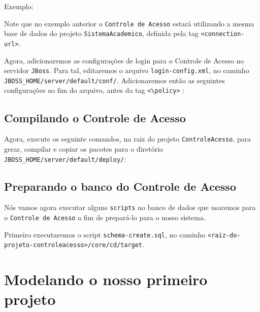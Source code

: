 Exemplo:

\begin{framed}
	
\end{framed}

Note que no exemplo anterior o \texttt{Controle de Acesso} estará utilizando a
mesma base de dados do projeto \texttt{SistemaAcademico}, definida pela tag
\texttt{<connection-url>}.

Agora, adicionaremos as configurações de login para o Controle de Acesso no
servidor \texttt{JBoss}. Para tal, editaremos o arquivo
\texttt{login-config.xml}, no caminho \texttt{JBOSS\_HOME/server/default/conf/}.
Adicionaremos então as seguintes configurações ao fim do arquivo, antes da tag
\texttt{<\textbackslash{}policy>} :

\begin{framed}
	
\end{framed}

\subsection{Compilando o Controle de Acesso}

Agora, execute os seguinte comandos, na raiz do projeto \texttt{ControleAcesso},
para gerar, compilar e copiar os pacotes para o diretório
\texttt{\textdollar{}JBOSS\_HOME/server/default/deploy/}:

\begin{framed}
	
\end{framed}

\subsection{Preparando o banco do Controle de Acesso}

Nós vamos agora executar alguns \texttt{scripts} no banco de dados que usaremos
para o \texttt{Controle de Acesso} a fim de prepará-lo para o nosso sistema.

Primeiro executaremos o script \texttt{schema-create.sql}, no caminho
\texttt{<raiz-do-projeto-controleacesso>/core/cd/target}.

\section{Modelando o nosso primeiro projeto}

